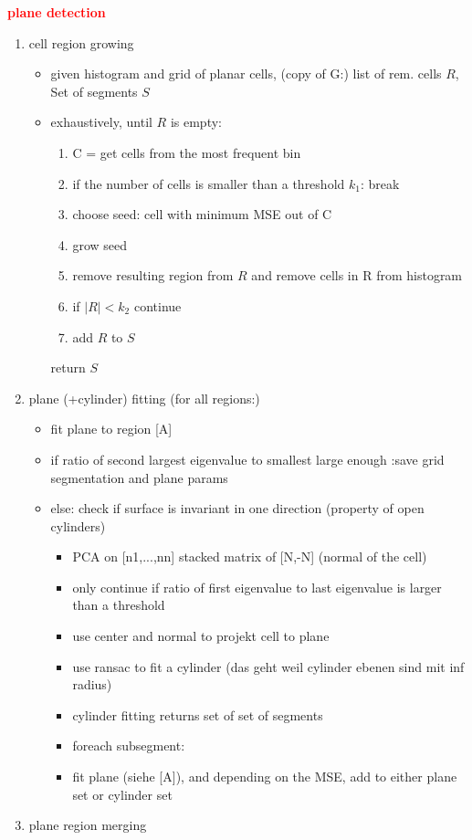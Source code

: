 \documentclass[main.tex]{subfiles}
\begin{document}
\textbf{\textcolor{red}{plane detection}}
\begin{enumerate}
    \item cell region growing
    \begin{itemize}
        \item given histogram and grid of planar cells, (copy of G:) list of rem. cells $R$, Set of segments $S$
        \item exhaustively, until $R$ is empty:
        \begin{enumerate}
            \item C = get cells from the most frequent bin
            \item if the number of cells is smaller than a threshold $k_1$: break
            \item choose seed: cell with minimum MSE out of C
            \item grow seed
            \item remove resulting region from $R$ and remove cells in R from histogram
            \item if $|R|< k_2$ continue
            \item add $R$ to $S$  
        \end{enumerate}
        return $S$
    \end{itemize}
    \item plane (+cylinder) fitting (for all regions:)
    \begin{itemize}
        \item fit plane to region  [A]
        \item if ratio of second largest eigenvalue to smallest large enough :save grid segmentation and plane params 
        \item else: check if surface is invariant in one direction (property of open cylinders)
        \begin{itemize}
            \item PCA on [n1,...,nn] stacked matrix of [N,-N] (normal of the cell)
            \item only continue if ratio of first eigenvalue to last eigenvalue is larger than a threshold
            \item use center and normal to projekt cell to plane
            \item use ransac to fit a cylinder (das geht weil cylinder ebenen sind mit inf radius)
            \item cylinder fitting returns set of set of segments
            \item foreach subsegment:
            \item fit plane (siehe [A]), and depending on the MSE, add to either plane set or cylinder set
        \end{itemize}
    \end{itemize}
    \item plane region merging
\end{enumerate}
\end{document}
